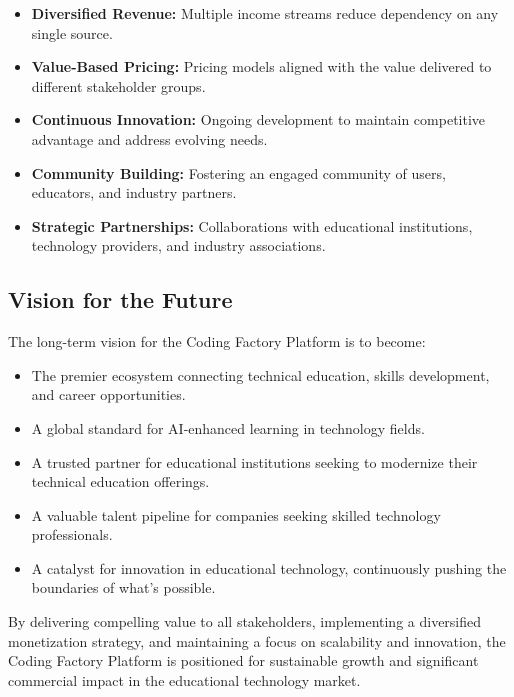 \documentclass[12pt,a4paper]{report}
\begin{document}
\begin{itemize}
    \item \textbf{Diversified Revenue:} Multiple income streams reduce dependency on any single source.

    \item \textbf{Value-Based Pricing:} Pricing models aligned with the value delivered to different stakeholder groups.

    \item \textbf{Continuous Innovation:} Ongoing development to maintain competitive advantage and address evolving needs.

    \item \textbf{Community Building:} Fostering an engaged community of users, educators, and industry partners.

    \item \textbf{Strategic Partnerships:} Collaborations with educational institutions, technology providers, and industry associations.
\end{itemize}

\subsection{Vision for the Future}

The long-term vision for the Coding Factory Platform is to become:

\begin{itemize}
    \item The premier ecosystem connecting technical education, skills development, and career opportunities.

    \item A global standard for AI-enhanced learning in technology fields.

    \item A trusted partner for educational institutions seeking to modernize their technical education offerings.

    \item A valuable talent pipeline for companies seeking skilled technology professionals.

    \item A catalyst for innovation in educational technology, continuously pushing the boundaries of what's possible.
\end{itemize}

By delivering compelling value to all stakeholders, implementing a diversified monetization strategy, and maintaining a focus on scalability and innovation, the Coding Factory Platform is positioned for sustainable growth and significant commercial impact in the educational technology market.
\end{document}
